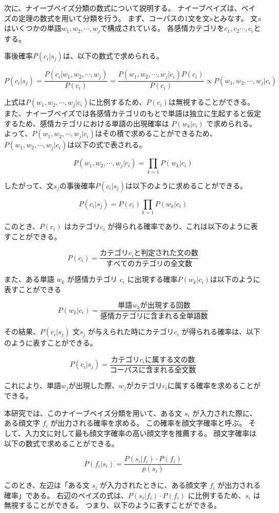 \documentclass[11pt,a4j]{jsarticle}
\begin{document}
次に、ナイーブベイズ分類の数式について説明する。
ナイーブベイズは、ベイズの定理の数式を用いて分類を行う。
まず、コーパスの1文を文$s$とみなす。
文$s$はいくつかの単語$w_1,w_2, \cdots ,w_j$で構成されている。
各感情カテゴリを$c_1,c_2 \cdots ,c_i$とする。

事後確率$P(c_i|s_j)$は、以下の数式で求められる。

\[
P(c_i|s_j)=\frac{P(c_i|w_1,w_2, \cdots ,w_j)}{P(c_i)}=\frac{P(w_1,w_2, \cdots ,w_j|c_i)P(c_i)}{P(c_i)} \propto P(w_1,w_2, \cdots ,w_j|c_i)
\]

上式は$P(w_1,w_2, \cdots ,w_j|c_i)$に比例するため、$P(c_i)$は無視することができる。
また、ナイーブベイズでは各感情カテゴリのもとで単語は独立に生起すると仮定するため、感情カテゴリにおける単語の出現確率は $P(w_k|c_i)$ で求められる。よって、$P(w_1,w_2, \cdots ,w_j|c_i)$はその積で求めることができるため、$P(w_1,w_2, \cdots ,w_j|c_i)$は以下の式で表される。

\[
P(w_1,w_2, \cdots ,w_j|c_i)=\prod_{k=1}P(w_k|c_i)
\]


したがって、文$s_j$の事後確率$P(c_i|s_j)$は以下のように求めることができる。

\[
P(c_i|s_j)=P(c_i)\prod_{k=1}P(w_k|c_i)
\]

このとき、$P(c_i)$ はカテゴリ$c_i$ が得られる確率であり、これは以下のように表すことができる。

\[
P(c_i)=\frac{カテゴリc_i と判定された文の数}{すべてのカテゴリの全文数}
\]

また、ある単語 $w_k$ が感情カテゴリ $c_i$ に出現する確率$P(w_k|c_i)$は以下のように表すことができる

\[
P(w_k|c_i)=\frac{単語 w_k が出現する回数}{感情カテゴリに含まれる全単語数}
\]

その結果、$P(c_i|s_j)$ 文$s_j$ が与えられた時にカテゴリ$c_i$ が得られる確率は、以下のように表すことができる。

\[
P(c_i|s_j)=\frac{カテゴリc_i に属する文の数}{コーパスに含まれる全文数}
\]

これにより、単語$w_j$が出現した際、$w_j$がカテゴリ$c_i$に属する確率を求めることができる。

本研究では、このナイーブベイズ分類を用いて、ある文 $s_i$ が入力された際に、ある顔文字 $f_i$ が出力される確率を求める。
この確率を顔文字確率と呼ぶ。
そして、入力文に対して最も顔文字確率の高い顔文字を推薦する。
顔文字確率は以下の数式で求めることができる。


\[
  P(f_i|s_i)=\frac{P(s_i|f_i) \cdot P(f_i)}{p(s_i)}
\]

このとき、左辺は「ある文 $s_i$ が入力されたときに、ある顔文字 $f_i$ が出力される確率」である。
右辺のベイズの式は、$P(s_i|f_i) \cdot P(f_i)$ に比例するため、$s_i$ は無視することができる。
つまり、以下のように表すことができる。
\end{document}
